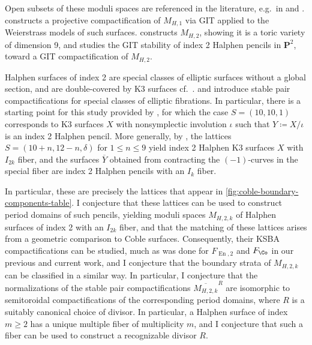 \documentclass{amsart}
\begin{document}
Open subsets of these moduli spaces are referenced in the literature, e.g.~in \cite[Rmk.\,5.4]{dolgachevChileanConfigurationConics2020} and \cite[\S. 3.3.3]{grivauxInfinitesimalDeformationsRational2018}. \cite{mirandaModuliWeierstrassFibrations1981} constructs a projective compactification of \(M_{H, 1}\) via GIT applied to the Weierstrass models of such surfaces. \cite{mirandaModuliSpaceRational2021} constructs \(M_{H, 2}\), showing it is a toric variety of dimension 9, and \cite{zanardiniStabilityPencilsPlane2023} studies the GIT stability of index 2 Halphen pencils in \({\mathbf{P}}^2\), toward a GIT compactification of \(M_{H, 2}\).

Halphen surfaces of index 2 are special classes of elliptic surfaces without a global section, and are double-covered by K3 surfaces cf.~\cite{kimura2018k3-surfaces}. \cite{ABE22} and \cite{AT21} introduce stable pair compactifications for special classes of elliptic fibrations. In particular, there is a starting point for this study provided by \cite{AE22}, for which the case \(S = (10, 10, 1)\) corresponds to K3 surfaces \(X\) with nonsymplectic involution \(\iota\) such that \(Y \coloneqq X/\iota\) is an index 2 Halphen pencil. More generally, by \cite[\S 4C]{AE22}, the lattices \(S = (10+n, 12-n, \delta)\) for \(1\leq n\leq 9\) yield index 2 Halphen K3 surfaces \(X\) with \(I_{2k}\) fiber, and the surfaces \(\overline{Y}\) obtained from contracting the \((-1)\)-curves in the special fiber are index 2 Halphen pencils with an \(I_k\) fiber.

In particular, these are precisely the lattices that appear in \cref{fig:coble-boundary-components-table}. I conjecture that these lattices can be used to construct period domains of such pencils, yielding moduli spaces \(M_{H, 2, k}\) of Halphen surfaces of index 2 with an \(I_{2k}\) fiber, and that the matching of these lattices arises from a geometric comparison to Coble surfaces. Consequently, their KSBA compactifications can be studied, much as was done for \(F_{\operatorname{En}, 2}\) and \(F_{\Co}\) in our previous and current work, and I conjecture that the boundary strata of \(M_{H, 2, k}\) can be classified in a similar way. In particular, I conjecture that the normalizations of the stable pair compactifications \(\overline{M_{H, 2, k}}^R\) are isomorphic to semitoroidal compactifications of the corresponding period domains, where \(R\) is a suitably canonical choice of divisor. In particular, a Halphen surface of index \(m\geq 2\) has a unique multiple fiber of multiplicity \(m\), and I conjecture that such a fiber can be used to construct a recognizable divisor \(R\).
\end{document}
